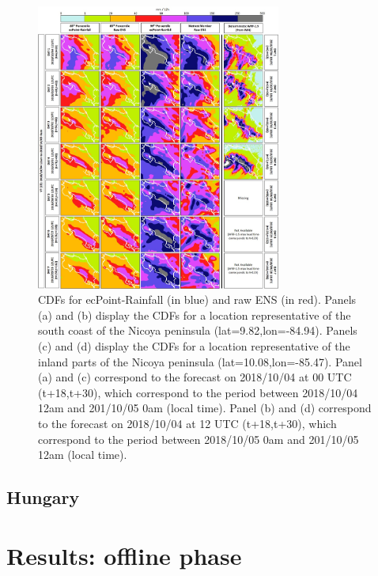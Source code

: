 \documentclass[twocol]{ametsocV5} %
\begin{document}
\begin{figure}
\centerline{\includegraphics[width=19pc]{manuscript/Figures/Fig8.jpg}}
\caption{CDFs for ecPoint-Rainfall (in blue) and raw ENS (in red). Panels (a) and (b) display the CDFs for a location representative of the south coast of the Nicoya peninsula (lat=9.82,lon=-84.94). Panels (c) and (d) display the CDFs for a location representative of the inland parts of the Nicoya peninsula (lat=10.08,lon=-85.47). Panel (a) and (c) correspond to the forecast on 2018/10/04 at 00 UTC (t+18,t+30), which correspond to the period between 2018/10/04 12am and 201/10/05 0am (local time). Panel (b) and (d) correspond to the forecast on 2018/10/04 at 12 UTC (t+18,t+30), which correspond to the period between 2018/10/05 0am and 201/10/05 12am (local time).}
\label{Fig8}
\end{figure}

\subsection{Hungary}


\section{Results: offline phase}
\end{document}
